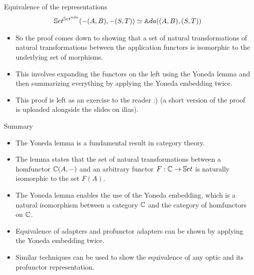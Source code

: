 \fi
\begin{frame}{Equivalence of the representations}
	\begin{align*}
		\mathbb{S}et^{\mathbb{S}et^{\mathbb{A}da}}(-(A, B), -(S, T)) \simeq {\mathbb{A}da}((A,B), (S,T))
	\end{align*}
	\begin{itemize}
		\pause\item So the proof comes down to showing that a set of natural transformations of natural transformations between the application functors is isomorphic to the underlying set of morphisms.
		\pause\item This involves expanding the functors on the left using the Yoneda lemma and then summarizing everything by applying the Yoneda embedding twice.
		\pause\item This proof is left as an exercise to the reader :) \pause(a short version of the proof is uploaded alongside the slides on ilias).
	\end{itemize}
\end{frame}
\begin{frame}{Summary}
	\begin{itemize}
		\item The Yoneda lemma is a fundamental result in category theory.
		\pause\item The lemma states that the set of natural transformations between a homfunctor $\mathbb{C}(A, -)$ and an arbitrary functor $F : \mathbb{C} \to \mathbb{S}et$ is naturally isomorphic to the set $F(A)$.
		\pause\item The Yoneda lemma enables the use of the Yoneda embedding, which is a natural isomorphism between a category $\mathbb{C}$ and the category of homfunctors on $\mathbb{C}$.
		\pause\item Equivalence of adapters and profunctor adapters can be shown by applying the Yoneda embedding twice.
		\pause\item Similar techniques can be used to show the equivalence of any optic and its profunctor representation.
	\end{itemize}
\end{frame}
